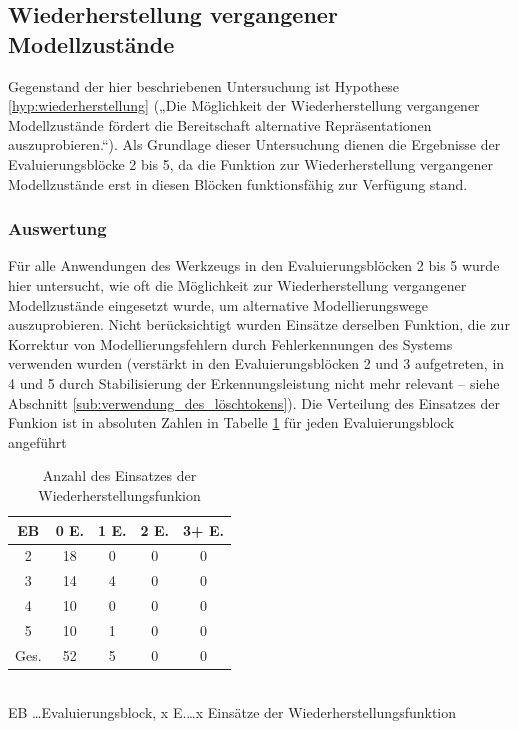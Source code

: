 
\subsection{Wiederherstellung vergangener Modellzustände} %
\label{sub:wiederherstellung_vergangener_modellzustände}

Gegenstand der hier beschriebenen Untersuchung ist Hypothese \ref{hyp:wiederherstellung} („Die Möglichkeit der Wiederherstellung vergangener Modellzustände fördert die Bereitschaft alternative Repräsentationen auszuprobieren.“). Als Grundlage dieser Untersuchung dienen die Ergebnisse der Evaluierungsblöcke 2 bis 5, da die Funktion zur Wiederherstellung vergangener Modellzustände erst in diesen Blöcken funktionsfähig zur Verfügung stand.

\subsubsection{Auswertung} 

Für alle Anwendungen des Werkzeugs in den Evaluierungsblöcken 2 bis 5 wurde hier untersucht, wie oft die Möglichkeit zur Wiederherstellung vergangener Modellzustände eingesetzt wurde, um alternative Modellierungswege auszuprobieren. Nicht berücksichtigt wurden Einsätze derselben Funktion, die zur Korrektur von Modellierungsfehlern durch Fehlerkennungen des Systems verwenden wurden (verstärkt in den Evaluierungsblöcken 2 und 3 aufgetreten, in 4 und 5 durch Stabilisierung der Erkennungsleistung nicht mehr relevant -- siehe Abschnitt \ref{sub:verwendung_des_löschtokens}). Die Verteilung des Einsatzes der Funkion ist in absoluten Zahlen in Tabelle \ref{tab:anzahl_wiederherstellung} für jeden Evaluierungsblock angeführt

\begin{table}[htbp]
	\centering
	\caption{Anzahl des Einsatzes der Wiederherstellungsfunkion}
\begin{tabular}{| c || c | c | c | c |}
  \hline
   EB    & 0 E. & 1 E. & 2 E. & 3+ E. \\ \hline
   2     & 18 & 0 & 0 & 0 \\ 
   3     & 14 & 4 & 0 & 0 \\ 
   4     & 10 & 0 & 0 & 0 \\ 
   5     & 10 & 1 & 0 & 0 \\ \hline
   Ges.  & 52 & 5 & 0 & 0 \\ \hline
\end{tabular} \\
\footnotesize EB \ldots Evaluierungsblock, x E.\ldots x Einsätze der Wiederherstellungsfunktion
	\label{tab:anzahl_wiederherstellung}
\end{table}

